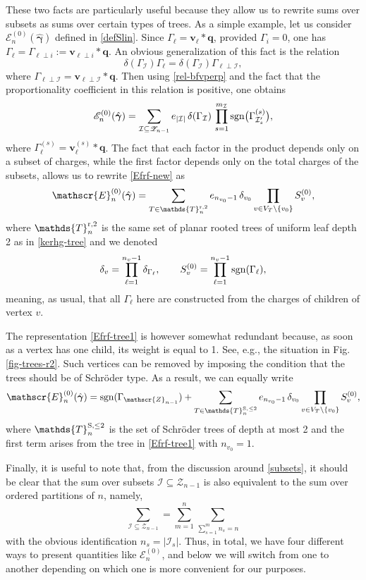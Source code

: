 \documentclass[12pt,letterpaper]{JHEP3}
\def\be{\begin{equation}}
\def\ee{\end{equation}}
\newcommand{\sgn}{{\rm sgn}}
\newcommand{\cI}{\mathcal{I}}
\newcommand{\IT}{\mathds{T}}
\def\Ev{\mathscr{E}}
\def\Zv{\mathscr{Z}}
\newcommand{\bfv}{{\boldsymbol v}}
\newcommand{\bfq}{{\boldsymbol q}}
\newcommand{\bfgam}{{\boldsymbol \gamma}}
\def\bfhgam{\hat\bfgam}
\def\Efrf{\Ev^{(0)}}
\def\mI{m_\cI}
\begin{document}
These two facts are particularly useful because they allow us to rewrite sums over subsets as sums over certain types of trees.
As a simple example, let us consider $\Efrf_n(\bfhgam)$ defined in \eqref{defSlin}.
Since $\Gamma_\ell=\bfv_\ell\ast\bfq$, provided $\Gamma_i=0$, one has $\Gamma_\ell=\Gamma_{\ell\perp i}:=\bfv_{\ell\perp i}\ast \bfq$.
An obvious generalization of this fact is the relation
\be 
\delta(\Gamma_\cI)\Gamma_\ell=\delta(\Gamma_\cI)\Gamma_{\ell\perp\cI},
\label{rel-delperp}
\ee 
where $\Gamma_{\ell\perp\cI}=\bfv_{\ell\perp \cI}\ast \bfq$.
Then using \eqref{rel-bfvperp} and the fact that the proportionality coefficient in this relation is positive, one obtains 
\be 
\Efrf_n(\bfhgam)=
\sum_{\cI\subseteq \Zv_{n-1}} e_{|\cI|}\,\delta(\Gamma_\cI)\, 
\prod_{s=1}^{\mI} \sgn\bigl(\Gamma^{(s)}_{\cI'_s}\bigr),
\label{Efrf-new}
\ee
where $\Gamma^{(s)}_\ell=\bfv^{(s)}_\ell\ast \bfq$.
The fact that each factor in the product depends only on a subset of charges, 
while the first factor depends only on the total charges of the subsets,
allows us to rewrite \eqref{Efrf-new} as 
\be 
\Efrf_n(\bfhgam)=\sum_{T\in \IT^{\rm r,2}_n} 
e_{n_{v_0}-1}\,\delta_{v_0}\prod_{v\in V_T\setminus\{v_0\}}S^{(0)}_v,
\label{Efrf-tree1}
\ee
where $\IT^{\rm r,2}_n$ is the same set of planar rooted trees of uniform leaf depth 2 as in \eqref{kerhg-tree} 
and we denoted
\be 
\delta_v=\prod_{\ell=1}^{n_v-1}\delta_{\Gamma_\ell},
\qquad
S^{(0)}_v=\prod_{\ell=1}^{n_v-1}\sgn(\Gamma_\ell),
\ee 
meaning, as usual, that all $\Gamma_\ell$ here are constructed from the charges of children of vertex $v$.

The representation \eqref{Efrf-tree1} is however somewhat redundant because, 
as soon as a vertex has one child, its weight is equal to 1.
See, e.g., the situation in Fig. \ref{fig-trees-r2}. 
Such vertices can be removed by imposing the condition that the trees should be of Schr\"oder type.
As a result, we can equally write
\be 
\Efrf_n(\bfhgam)=\sgn(\Gamma_{\Zv_{n-1}}) 
+\sum_{T\in \IT^{\rm S,\leq 2}_n} 
e_{n_{v_0}-1}\,\delta_{v_0}\prod_{v\in V_T\setminus\{v_0\}}S^{(0)}_v,
\label{Efrf-tree2}
\ee
where $\IT^{\rm S,\leq 2}_n$ is the set of Schr\"oder trees of depth at most 2 and
the first term arises from the tree in \eqref{Efrf-tree1} with $n_{v_0}=1$.

Finally, it is useful to note that, from the discussion around \eqref{subsets}, it should be clear that
the sum over subsets $\cI\subseteq\Zv_{n-1}$ is also equivalent to the sum over ordered partitions of $n$,
namely,
\be 
\sum_{\cI\subseteq\Zv_{n-1}} =\sum_{m=1}^n\sum_{\sum_{s=1}^{m} n_s=n}
\label{ident-sumset}
\ee 
with the obvious identification $n_s=|\cI_s|$.
Thus, in total, we have four different ways to present quantities like $\Efrf_n$, 
and below we will switch from one to another depending on which one is more convenient for our purposes.
\end{document}
